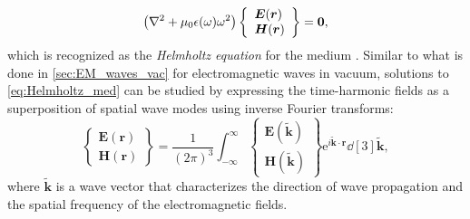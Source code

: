 \begin{equation} \label{eq:Helmholtz_med}
 \left( \laplacian + \mu_0 \epsilon (\omega) \omega^2 \right) \left\{
  \begin{array}{lr}
  \mathbold{E}(\mathbold{r})\\
  \mathbold{H}(\mathbold{r})
  \end{array}
 \right\} = \mathbf{0} ,
 \end{equation}
which is recognized as the \emph{Helmholtz equation} for the medium \cite{Landau60,Jackson75}. 
Similar to what is done in \cref{sec:EM_waves_vac} for electromagnetic waves in vacuum, solutions to \cref{eq:Helmholtz_med} can be studied by expressing the time-harmonic fields as a superposition of spatial wave modes using inverse Fourier transforms:
\begin{equation} \label{eq:fourier_fields_complex}
 \left\{
  \begin{array}{lr}
  \mathbold{E} \left( \mathbold{r} \right) \\
  \mathbold{H} \left( \mathbold{r} \right)
  \end{array}
 \right\} = \frac{1}{(2 \pi)^3} \int_{-\mathbold{\infty}}^{\mathbold{\infty}} \left\{
  \begin{array}{lr}
  \mathbold{E} \left( \mathbold{\tilde{k}} \right) \\
  \mathbold{H} \left( \mathbold{\tilde{k}} \right)
  \end{array}
 \right\} \mathrm{e}^{i \mathbold{\tilde{k}} \cdot \mathbold{r}} \dd[3]{\mathbold{\tilde{k}}},
 \end{equation}
where $\mathbold{\tilde{k}}$ is a wave vector that characterizes the direction of wave propagation and the spatial frequency of the electromagnetic fields.

